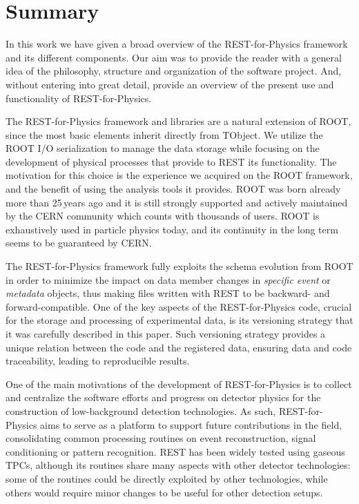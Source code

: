 \section{Summary}

In this work we have given a broad overview of the REST-for-Physics framework and its different components. Our aim was to provide the reader with a general idea of the philosophy, structure and organization of the software project. And, without entering into great detail, provide an overview of the present use and functionality of REST-for-Physics.

The REST-for-Physics framework and libraries are a natural extension of ROOT, since the most basic elements inherit directly from TObject. We utilize the ROOT I/O serialization to manage the data storage while focusing on the development of physical processes that provide to REST its functionality. The motivation for this choice is the experience we acquired on the ROOT framework, and the benefit of using the analysis tools it provides. ROOT was born already more than 25\,years ago and it is still strongly supported and actively maintained by the CERN community which counts with thousands of users. ROOT is exhaustively used in particle physics today, and its continuity in the long term seems to be guaranteed by CERN.

The REST-for-Physics framework fully exploits the schema evolution from ROOT in order to minimize the impact on data member changes in \emph{specific event} or \emph{metadata} objects, thus making files written with REST to be backward- and forward-compatible. One of the key aspects of the REST-for-Physics code, crucial for the storage and processing of experimental data, is its versioning strategy that it was carefully described in this paper. Such versioning strategy provides a unique relation between the code and the registered data, ensuring data and code traceability, leading to reproducible results.

One of the main motivations of the development of REST-for-Physics is to  collect and centralize the software efforts and progress on detector physics for the construction of low-background detection technologies. As such, REST-for-Physics aims to serve as a platform to support future contributions in the field, consolidating common processing routines on event reconstruction, signal conditioning or pattern recognition. REST has been widely tested using gaseous TPCs, although its routines share many aspects with other detector technologies: some of the routines could be directly exploited by other technologies, while others would require minor changes to be useful for other detection setups.

